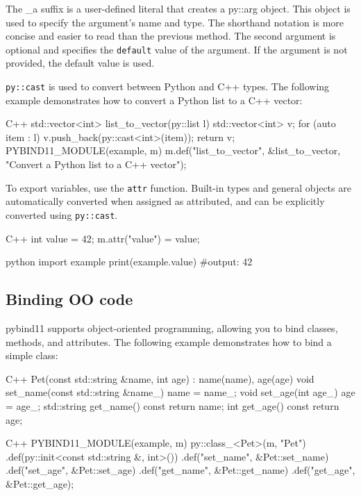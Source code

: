 The \_a suffix is a user-defined literal that creates a py::arg object. This object is used to specify the argument's name and type. The shorthand notation is more concise and easier to read than the previous method.
The second argument is optional and specifies the \texttt{default} value of the argument. If the argument is not provided, the default value is used.

\texttt{py::cast} is used to convert between Python and C++ types. The following example demonstrates how to convert a Python list to a C++ vector:

\begin{neonlisting}[language=C++]{C++}
std::vector<int> list_to_vector(py::list l) {
    std::vector<int> v;
    for (auto item : l) {
        v.push_back(py::cast<int>(item));
    }
    return v;
}
PYBIND11_MODULE(example, m) {
    m.def("list_to_vector", &list_to_vector, "Convert a Python list to a C++ vector");
}
\end{neonlisting}

To export variables, use the \texttt{attr} function. Built-in types and general objects are automatically converted when assigned as attributed, 
and can be explicitly converted using \texttt{py::cast}.

\begin{neonlisting}[language=C++]{C++}
int value = 42;
m.attr("value") = value;
\end{neonlisting}

\begin{neonlisting}{python}
import example
print(example.value) #output: 42
\end{neonlisting}

\subsection{Binding OO code}

pybind11 supports object-oriented programming, allowing you to bind classes, methods, and attributes. The following example demonstrates how to bind a simple class:

\begin{neonlisting}[language=C++]{C++}
Pet(const std::string &name, int age) : name(name), age(age) {}
void set_name(const std::string &name_) { name = name_; }
void set_age(int age_) { age = age_; }
std::string get_name() const { return name; }
int get_age() const { return age; }
\end{neonlisting}

\begin{neonlisting}[language=C++]{C++}
PYBIND11_MODULE(example, m) {
    py::class_<Pet>(m, "Pet")
        .def(py::init<const std::string &, int>())
        .def("set_name", &Pet::set_name)
        .def("set_age", &Pet::set_age)
        .def("get_name", &Pet::get_name)
        .def("get_age", &Pet::get_age);
}
\end{neonlisting}

